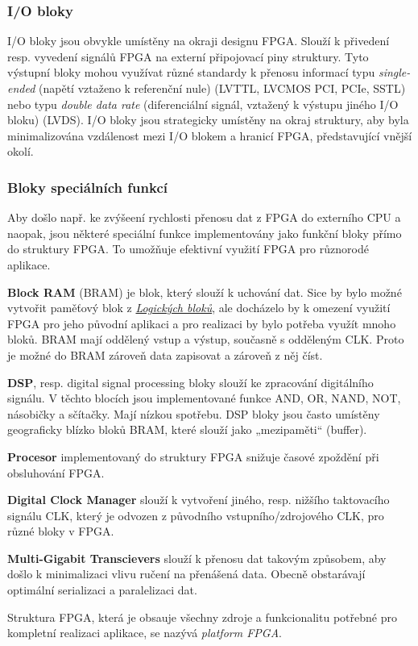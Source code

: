 \documentclass[a4paper, twoside, 11pt]{article}
\begin{document}
		\subsubsection{I/O bloky}
				I/O bloky jsou obvykle umístěny na okraji designu FPGA. Slouží k přivedení resp. vyvedení signálů FPGA na externí připojovací piny struktury. Tyto výstupní bloky mohou využívat různé standardy k přenosu informací typu \textit{single-ended} (napětí vztaženo k referenční nule) (LVTTL, LVCMOS PCI, PCIe, SSTL) nebo typu \textit{double data rate} (diferenciální signál, vztažený k výstupu jiného I/O bloku) (LVDS). I/O bloky jsou strategicky umístěny na okraj struktury, aby byla minimalizována vzdálenost mezi I/O blokem a hranicí FPGA, představující vnější okolí. \cite{Sass2010} \cite{pang-beginning-fpga}

		\subsubsection{Bloky speciálních funkcí}
			Aby došlo např. ke zvýšeení rychlosti přenosu dat z FPGA do externího CPU a naopak, jsou některé speciální funkce implementovány jako funkční bloky přímo do struktury FPGA. To umožňuje efektivní využití FPGA pro různorodé aplikace. \cite{Sass2010}\par
			\textbf{Block RAM} (BRAM) je blok, který slouží k uchování dat. Sice by bylo možné vytvořit paměťový blok z \hyperref[subsubsec:logicke-bloky]{\textit{Logických bloků}}, ale docházelo by k omezení využití FPGA pro jeho původní aplikaci a pro realizaci by bylo potřeba využít mnoho bloků. BRAM mají oddělený vstup a výstup, současně s odděleným CLK. Proto je možné do BRAM zároveň data zapisovat a zároveň z něj číst. \cite{Sass2010}\par
			\textbf{DSP}, resp. digital signal processing bloky slouží ke zpracování digitálního signálu. V těchto blocích jsou implementované funkce AND, OR, NAND, NOT, násobičky a sčítačky. Mají nízkou spotřebu. DSP bloky jsou často umístěny geograficky blízko bloků BRAM, které slouží jako „mezipaměti“ (buffer). \cite{Sass2010}\par
			\textbf{Procesor} implementovaný do struktury FPGA snižuje časové zpoždění při obsluhování FPGA. \cite{Sass2010}\par
			\textbf{Digital Clock Manager} slouží k vytvoření jiného, resp. nižšího taktovacího signálu CLK, který je odvozen z původního vstupního/zdrojového CLK, pro různé bloky v FPGA. \cite{Sass2010}\par
			\textbf{Multi-Gigabit Transcievers} slouží k přenosu dat takovým způsobem, aby došlo k minimalizaci vlivu ručení na přenášená data. Obecně obstarávají optimální serializaci a paralelizaci dat. \cite{Sass2010}\par
			Struktura FPGA, která je obsauje všechny zdroje a funkcionalitu potřebné pro kompletní realizaci aplikace, se nazývá \textit{platform FPGA}.
\end{document}
